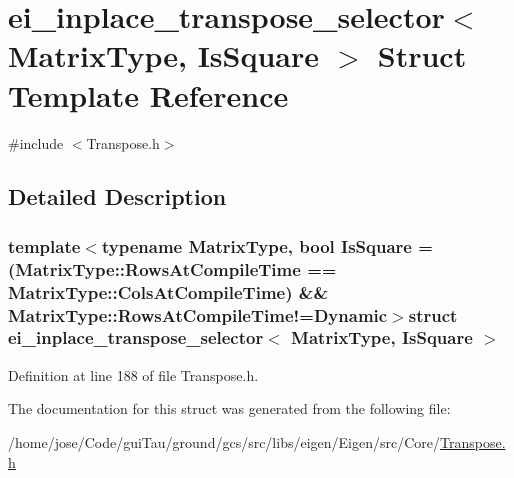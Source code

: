 \hypertarget{structei__inplace__transpose__selector}{\section{ei\-\_\-inplace\-\_\-transpose\-\_\-selector$<$ Matrix\-Type, Is\-Square $>$ Struct Template Reference}
\label{structei__inplace__transpose__selector}
}


{\ttfamily \#include $<$Transpose.\-h$>$}



\subsection{Detailed Description}
\subsubsection*{template$<$typename Matrix\-Type, bool Is\-Square = (\-Matrix\-Type\-::\-Rows\-At\-Compile\-Time == Matrix\-Type\-::\-Cols\-At\-Compile\-Time) \&\& Matrix\-Type\-::\-Rows\-At\-Compile\-Time!=\-Dynamic$>$struct ei\-\_\-inplace\-\_\-transpose\-\_\-selector$<$ Matrix\-Type, Is\-Square $>$}



Definition at line 188 of file Transpose.\-h.



The documentation for this struct was generated from the following file\-:\begin{DoxyCompactItemize}
\item 
/home/jose/\-Code/gui\-Tau/ground/gcs/src/libs/eigen/\-Eigen/src/\-Core/\hyperlink{_transpose_8h}{Transpose.\-h}\end{DoxyCompactItemize}
